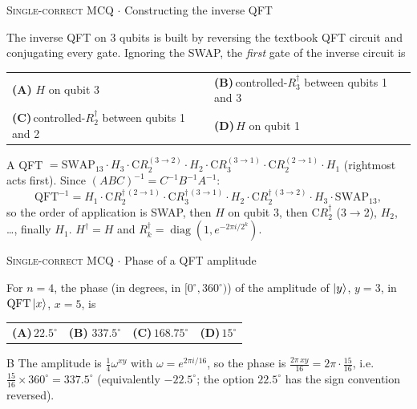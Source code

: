\documentclass[11pt,a4paper]{article}
\newcommand{\optlabel}[1]{\textbf{(#1)}}
\newcommand{\correctlabel}[1]{\textcolor{okgreen}{\textbf{(#1)}\,\ding{51}}}
\newenvironment{qitem}[1]{\begin{list}{}{\setlength{\leftmargin}{3.3em}\setlength{\labelwidth}{3.1em}%
  \setlength{\labelsep}{0.2em}\setlength{\topsep}{3pt}\setlength{\parsep}{3pt}}\item[\textbf{Q.#1}\hfill]}{\end{list}}
\newcommand{\qsep}{\par\vspace{2pt}{\color{black!15}\hrule}\vspace{4pt}}
\newcommand{\qmeta}[2]{{\footnotesize\color{black!60}\textsc{#1} \;$\cdot$\; #2}\par}
\begin{document}
\begin{qitem}{51}
\qmeta{Single-correct MCQ}{Constructing the inverse QFT}
The inverse QFT on 3 qubits is built by reversing the textbook QFT circuit and conjugating every gate. Ignoring the
SWAP, the \emph{first} gate of the inverse circuit is
\par\smallskip\noindent\begin{tabularx}{\linewidth}{@{}*{2}{L}@{}}
\correctlabel{A}\,$H$ on qubit 3 & \optlabel{B}\,controlled-$R_3^\dagger$ between qubits 1 and 3 \\[3pt]
\optlabel{C}\,controlled-$R_2^\dagger$ between qubits 1 and 2 & \optlabel{D}\,$H$ on qubit 1
\end{tabularx}
\end{qitem}
\begin{solbox}{A}
QFT $= \mathrm{SWAP}_{13}\cdot H_3\cdot \mathrm{C}R_2^{(3\to2)}\cdot H_2\cdot\mathrm{C}R_3^{(3\to1)}\cdot \mathrm{C}R_2^{(2\to1)}\cdot H_1$
(rightmost acts first). Since $(ABC)^{-1} = C^{-1}B^{-1}A^{-1}$:
\[ \mathrm{QFT}^{-1} = H_1\cdot \mathrm{C}R_2^{\dagger\,(2\to1)}\cdot\mathrm{C}R_3^{\dagger\,(3\to1)}\cdot H_2\cdot \mathrm{C}R_2^{\dagger\,(3\to2)}\cdot H_3\cdot \mathrm{SWAP}_{13}, \]
so the order of application is SWAP, then $H$ on qubit 3, then $\mathrm{C}R_2^\dagger$ (3$\to$2), $H_2$, \dots, finally $H_1$.
$H^\dagger = H$ and $R_k^\dagger = \operatorname{diag}(1, e^{-2\pi i/2^k})$.
\end{solbox}
\qsep

\begin{qitem}{52}
\qmeta{Single-correct MCQ}{Phase of a QFT amplitude}
For $n = 4$, the phase (in degrees, in $[0^\circ, 360^\circ)$) of the amplitude of $\ket{y}$, $y = 3$, in $\mathrm{QFT}\ket{x}$, $x = 5$, is
\par\smallskip\noindent\begin{tabularx}{\linewidth}{@{}*{4}{L}@{}}
\optlabel{A}\,$22.5^\circ$ & \correctlabel{B}\,$337.5^\circ$ & \optlabel{C}\,$168.75^\circ$ & \optlabel{D}\,$15^\circ$
\end{tabularx}
\end{qitem}
\begin{solbox}{B}
The amplitude is $\frac14\omega^{xy}$ with $\omega = e^{2\pi i/16}$, so the phase is
$\frac{2\pi\,xy}{16} = 2\pi\cdot\frac{15}{16}$, i.e.\ $\frac{15}{16}\times360^\circ = 337.5^\circ$ (equivalently $-22.5^\circ$; the option
$22.5^\circ$ has the sign convention reversed).
\end{solbox}
\qsep
\end{document}
